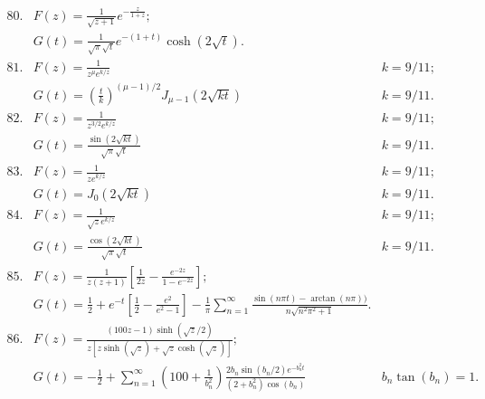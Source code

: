 \documentclass[10pt]{article}
\begin{document}
\[
\begin{array}{llr}

80. & F(z)= \frac{1}{\sqrt{z+1}}e^{-\frac{z}{1+z}};& \\[1cm]
  & G(t)= \frac{1}{\sqrt{\pi}\sqrt{t}}e^{-(1+t)}\cosh(2\sqrt{t}).  &\\[1cm]
81. & F(z)= \frac{1}{z^{\mu}e^{k/z}}&k=9/11; \\[1cm]
  & G(t)=(\frac{t}{k})^{(\mu -1)/2}J_{\mu -1}(2\sqrt{kt})& k=9/11.\\[1cm]
82. & F(z)= \frac{1}{z^{3/2}e^{k/z}}&k=9/11; \\[1cm]
  & G(t)=\frac{\sin(2\sqrt{kt})}{\sqrt{\pi}\sqrt{t}}& k=9/11.\\[1cm]
83. & F(z)= \frac{1}{ze^{k/z}}&k=9/11; \\[1cm]
  & G(t)=J_{0}(2\sqrt{kt})& k=9/11.\\[1cm]
84. & F(z)= \frac{1}{\sqrt{z}e^{k/z}}&k=9/11; \\[1cm]
  & G(t)=\frac{\cos(2\sqrt{kt})}{\sqrt{\pi}\sqrt{t}}& k=9/11.\\[1cm]
85. & F(z) = \frac{1}{z(z+1)}\left [ \frac{1}{2z}-\frac{e^{-2z}}{1-e^{-2z}}\right ];&  \\[1cm]
  & G(t)=\frac{1}{2} + e^{-t}\left [ \frac{1}{2}- \frac{e^{2}}{e^{2}-1}\right ]-\frac{1}{\pi}\sum_{n=1}^{\infty}\frac{\sin (n \pi t)- \arctan(n \pi ))}{n\sqrt{n^{2}\pi^{2}+1}}.& \\[1cm]
86. & F(z)=   \frac{(100z-1)\sinh(\sqrt{z}/2)}{z[z\sinh(\sqrt{z})+\sqrt{z}\cosh(\sqrt{z})]};& \\[1cm]
& G(t) = -\frac{1}{2}+\sum_{n=1}^{\infty}\left (100 + \frac{1}{b_n^{2}} \right )\frac{2b_n\sin(b_n/2)e^{-b_n^{2}t}}{(2+b_n^{2})\cos(b_n)}& b_n\tan (b_n)=1.\\[1cm]


\end{array}
\]
\end{document}
